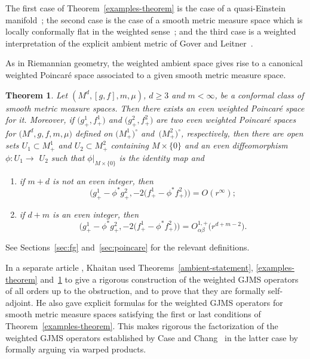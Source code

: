 \documentclass[10pt,a4paper]{amsart}
\numberwithin{equation}{section}
\newtheorem{Theorem}{Theorem}[section]
\begin{document}
The first case of Theorem~\ref{examples-theorem} is the case of a quasi-Einstein manifold~\cite{Case_Shu_Wei};
the second case is the case of a smooth metric measure space which is locally conformally flat in the weighted sense~\cite{Case2014s};
and the third case is a weighted interpretation of the explicit ambient metric of Gover and Leitner~\cite{GoverLeitner2009}.

As in Riemannian geometry, the weighted ambient space gives rise to a canonical weighted Poincar\'e space associated to a given smooth metric measure space.

\begin{Theorem}
\label{poincare-statement}
Let $(M^{d}, [g, f], m, \mu)$, $d\geq 3$ and $m<\infty$, be a conformal class of smooth metric measure spaces. Then there exists an even weighted Poincar\'e space for it. Moreover, if $\bigl(g_{+}^{1}, f_{+}^{1}\bigr)$ and $\bigl(g_{+}^{2}, f_{+}^{2}\bigr)$ are two even weighted Poincar\'e spaces for $\bigl(M^{d}, g, f, m, \mu\bigr)$ defined on $\bigl(M_{+}^{1}\bigr)^{\circ}$ and~$\bigl(M_{+}^{2}\bigr)^{\circ}$, respectively, then there are open sets $U_{1} \subset M_{+}^{1}$ and $U_{2} \subset M_{+}^{2}$ containing $M \times\{0\}$ and an even diffeomorphism $\phi\colon U_{1} \rightarrow$ $U_{2}$ such that $\phi|_{M \times\{0\}}$ is the identity map and
\begin{enumerate}[label=$(\roman*)$]\itemsep=0pt
\item if $m+d$ is not an even integer, then
\[
\bigl(g_{+}^{1}-\phi^{*} g_{+}^{2}, -2\big(f_{+}^{1}-\phi^{*} f_{+}^{2}\big)\bigr)=O(r^{\infty});
\]

\item if $d+m$ is an even integer, then
\[
\bigl(g_{+}^{1}-\phi^{*} g_{+}^{2}, -2\big(f_{+}^{1}-\phi^{*} f_{+}^{2}\big)\bigr)=O_{\alpha \beta}^{1,+}\big(r^{d+m-2}\big).
\]
\end{enumerate}
\end{Theorem}
See Sections~\ref{sec:fg} and~\ref{sec:poincare} for the relevant definitions.

In a separate article \cite{Khaitan2022}, Khaitan used Theorems~\ref{ambient-statement}, \ref{examples-theorem} and~\ref{poincare-statement} to give a rigorous construction of the weighted GJMS operators of all orders up to the obstruction, and to prove that they are formally self-adjoint. He also gave explicit formulas for the weighted GJMS operators for smooth metric measure spaces satisfying the first or last conditions of Theorem~\ref{examples-theorem}.
This makes rigorous the factorization of the weighted GJMS operators established by Case and Chang~\cite{CaseChang2013} in the latter case by formally arguing via warped products.
\end{document}
